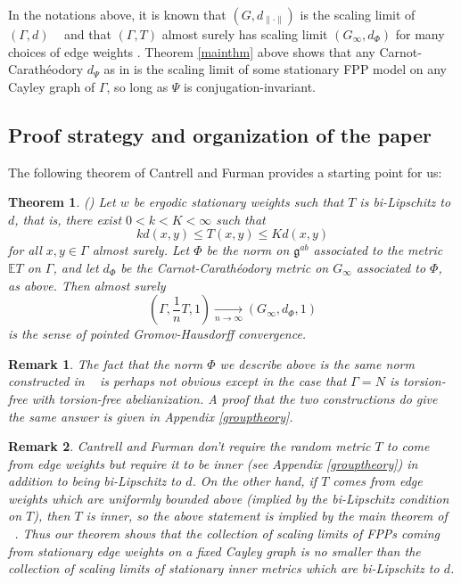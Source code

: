 \documentclass[12pt,reqno]{article}
\makeatletter
\let\reftagform@=\tagform@
\def\tagform@#1{\maketag@@@{(\ignorespaces\textcolor{purple}{#1}\unskip\@@italiccorr)}}
\renewcommand{\eqref}[1]{\textup{\reftagform@{\ref{#1}}}}
\numberwithin{equation}{section}
\newcommand{\E}{\mathbb{E}}
\newcommand{\tendsto}[2]{\xrightarrow[#1 \to #2]{}}
\newcommand{\g}{\mathfrak{g}}
\newtheorem{thm}{Theorem}
\newtheorem{rmk}{Remark}
\makeatother
\begin{document}
 
  In the notations above, it is known that $(G, d_{\| \cdot \|})$ is the scaling limit of $(\Gamma, d)$ ~\cite{Pansu} and that $(\Gamma, T)$ 
  almost surely has 
  scaling limit $(G_{\infty}, d_{\Phi})$ for many choices of edge weights \cite{BenjaminiTessera, CantrellFurman}.  Theorem \ref{mainthm} above 
  shows that any Carnot-Carath\'eodory  $d_{\Psi}$  as in \eqref{met:CC} is the scaling limit of some stationary FPP model
 on any Cayley graph of $\Gamma$, so long as $\Psi$ is conjugation-invariant.

 
 
 
 
 
 
 
 
 
 
 
 
 


\subsection{Proof strategy and organization of the paper}

The following theorem of Cantrell and Furman\cite{CantrellFurman}  provides a starting point for us:
 
 \begin{thm}{(\cite{CantrellFurman})} \label{cantrellfurmanthm}
 Let $w$ be ergodic stationary weights such that $T$ is bi-Lipschitz to $d$, that is, there exist $0<k<K<\infty$ such that
 \[ kd(x,y) \le T(x,y) \le Kd(x,y) \]
 for all $x,y \in \Gamma$ almost surely. Let $\Phi$ be the norm on $\g^{ab}$ associated to the metric $\E T$ on $\Gamma$, 
 and let $d_{\Phi}$ be the Carnot-Carath\'eodory metric on $G_{\infty}$ associated to $\Phi$, as above. Then almost surely
\begin{equation}\label{ehww}
 \left(\Gamma, \frac{1}{n} T, 1\right) \tendsto{n}{\infty} (G_{\infty}, d_{\Phi}, 1) 
 \end{equation}
 is the sense of pointed Gromov-Hausdorff convergence.
 \end{thm}
 \begin{rmk}
 The fact that the norm $\Phi$ we describe above is the same norm constructed in ~\cite{CantrellFurman} is perhaps not obvious
 except in the case that $\Gamma=N$ is torsion-free with torsion-free abelianization. A proof that the two constructions do give the
 same answer is given in Appendix \ref{grouptheory}.
 \end{rmk}
 \begin{rmk}
 Cantrell and Furman don't require the random metric $T$ to come from
 edge weights but require it to be \emph{inner} (see Appendix \ref{grouptheory}) in addition to being bi-Lipschitz to $d$.
 On the other hand, if $T$ comes from edge weights which are uniformly bounded above (implied by the bi-Lipschitz
 condition on $T$), then $T$ is inner, so the above statement is implied by the main theorem of ~\cite{CantrellFurman}.
 Thus our theorem shows that the collection of scaling limits of FPPs coming from stationary edge weights on a fixed Cayley graph is no smaller
 than the collection of scaling limits of stationary inner metrics which are bi-Lipschitz to $d$.
 \end{rmk}
 
\end{document}
